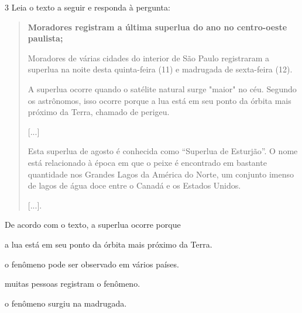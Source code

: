
\num{3} Leia o texto a seguir e responda à pergunta:

\begin{quote}
\textbf{Moradores registram a última superlua do ano no centro-oeste
paulista;}

Moradores de várias cidades do interior de São Paulo registraram a
superlua na noite desta quinta-feira (11) e madrugada de sexta-feira
(12).

A superlua ocorre quando o satélite natural surge "maior" no céu.
Segundo os astrônomos, isso ocorre porque a lua está em seu ponto da
órbita mais próximo da Terra, chamado de perigeu.

{[}...{]}

Esta superlua de agosto é conhecida como ``Superlua de Esturjão''. O
nome está relacionado à época em que o peixe é encontrado em bastante
quantidade nos Grandes Lagos da América do Norte, um conjunto imenso de
lagos de água doce entre o Canadá e os Estados Unidos.

{[}...{]}.

\end{quote}

De acordo com o texto, a superlua ocorre porque

\begin{escolha}
\item a lua está em seu ponto da órbita mais próximo da Terra.

\item o fenômeno pode ser observado em vários países.

\item muitas pessoas registram o fenômeno.

\item o fenômeno surgiu na madrugada.
\end{escolha}

